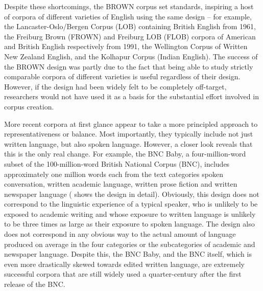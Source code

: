 Despite these shortcomings, the BROWN  corpus set standards, inspiring a host of corpora of different varieties  of English using the same design --  for example, the Lancaster\hyp{}Oslo\slash Bergen Corpus (LOB)  containing British  English from 1961, the Freiburg Brown (FROWN)  and Freiburg LOB (FLOB)  corpora of American  and British English respectively from 1991, the Wellington Corpus of Written New Zealand English, and the Kolhapur  Corpus (Indian  English). The success of the BROWN  design was partly due to the fact that being able to study strictly comparable corpora of different varieties  is useful regardless of their design. However, if the design had been widely felt to be completely off\hyp{}target, researchers would not have used it as a basis for the substantial effort involved in corpus creation.

More recent corpora at first glance appear to take a more principled approach to representativeness or balance. Most importantly, they typically include not just written  language, but also spoken  language. However, a closer look reveals that this is the only real change. For example, the BNC Baby,  a four\hyp{}million\hyp{}word subset of the 100\hyp{}million\hyp{}word British National Corpus (BNC),  includes approximately one million words each from the text categories spoken conversation,  written academic  language, written prose fiction  and written newspaper  language ( shows the design  in detail). Obviously, this design  does not correspond to the linguistic experience of a typical speaker, who is unlikely to be exposed to academic writing  and whose exposure to written language is unlikely to be three times as large as their exposure to spoken  language. The design  also does not correspond in any obvious way to the actual amount of language produced on average in the four categories  or the subcategories of academic  and newspaper  language. Despite this, the BNC Baby,  and the BNC  itself, which is even more drastically skewed towards edited written  language, are extremely successful corpora that are still widely used a quarter\hyp{}century after the first release of the  BNC.

